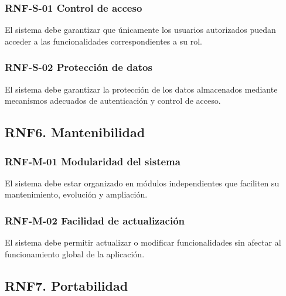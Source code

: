 \vspace{-0.75em}
\subsubsection{RNF-S-01 Control de acceso}
\vspace{-1em}

El sistema debe garantizar que únicamente los usuarios autorizados puedan acceder a las funcionalidades correspondientes a su rol.

\vspace{-0.75em}
\subsubsection{RNF-S-02 Protección de datos}
\vspace{-1em}

El sistema debe garantizar la protección de los datos almacenados mediante mecanismos adecuados de autenticación y control de acceso.

\subsection{RNF6. Mantenibilidad}

\vspace{-0.75em}
\subsubsection{RNF-M-01 Modularidad del sistema}
\vspace{-1em}

El sistema debe estar organizado en módulos independientes que faciliten su mantenimiento, evolución y ampliación.

\vspace{-0.75em}
\subsubsection{RNF-M-02 Facilidad de actualización}
\vspace{-1em}

El sistema debe permitir actualizar o modificar funcionalidades sin afectar al funcionamiento global de la aplicación.

\subsection{RNF7. Portabilidad}

